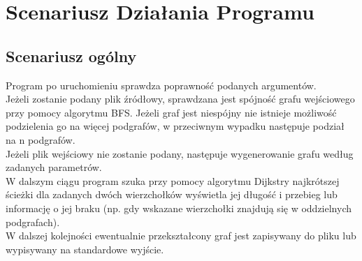 \documentclass{article}
\begin{document}
\section{Scenariusz Działania Programu}

\subsection{Scenariusz ogólny}
Program po uruchomieniu sprawdza poprawność podanych argumentów. 
\\
Jeżeli zostanie podany plik źródłowy, sprawdzana jest spójność grafu wejściowego przy pomocy algorytmu BFS. Jeżeli graf jest niespójny nie istnieje możliwość podzielenia go na więcej podgrafów, w przeciwnym wypadku następuje podział na n podgrafów.
\\
Jeżeli plik wejściowy nie zostanie podany, następuje wygenerowanie grafu według zadanych parametrów.
\\
W dalszym ciągu program szuka przy pomocy algorytmu Dijkstry najkrótszej ścieżki dla zadanych dwóch wierzchołków wyświetla jej długość i przebieg lub informację o jej braku (np. gdy wskazane wierzchołki znajdują się w oddzielnych podgrafach).
\\
W dalszej kolejności ewentualnie przekształcony graf jest zapisywany do pliku lub wypisywany na standardowe wyjście.
\end{document}
